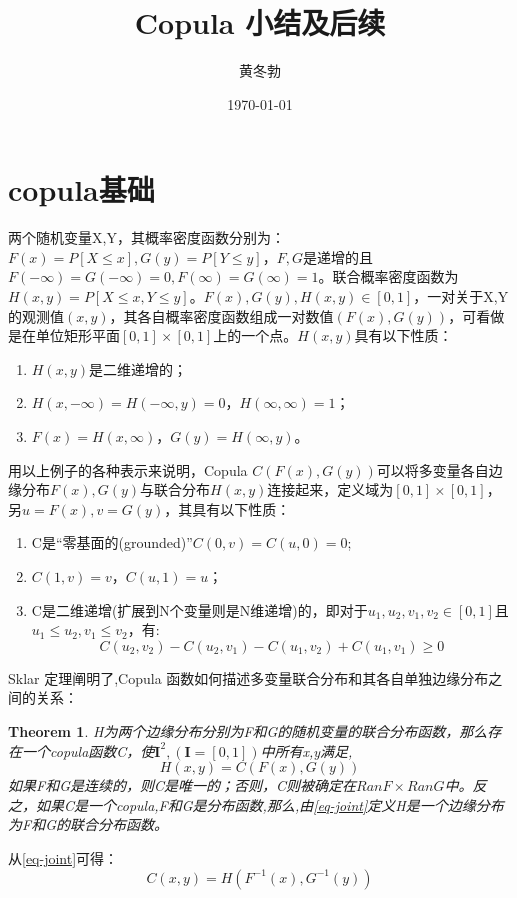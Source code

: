 \documentclass[UTF8]{ctexart}
\title{\heiti Copula 小结及后续}
\author{\kaishu 黄冬勃}
\date{\today}
\newtheorem{theorem}{Theorem}[section]
\begin{document}
\maketitle

\section{copula基础}
两个随机变量X,Y，其概率密度函数分别为：$F(x) = P[X\leq x], G(y) = P[Y \leq y]$，$F,G$是递增的且$F(-\infty)=G(-\infty)=0,F(\infty)=G(\infty)=1$。联合概率密度函数为$H(x,y) = P[X\leq x, Y\leq y]$。$F(x),G(y),H(x,y) \in [0,1]$，一对关于X,Y的观测值$(x,y)$，其各自概率密度函数组成一对数值$(F(x),G(y))$，可看做是在单位矩形平面$[0,1]\times[0,1]$上的一个点。$H(x,y)$具有以下性质：
\begin{enumerate}[1.]
    \item $H(x,y)$是二维递增的；
    \item $H(x,-\infty) = H(-\infty,y) = 0$，$H(\infty,\infty)=1$；
    \item $F(x) = H(x,\infty)$，$G(y) = H(\infty,y)$。
\end{enumerate}

用以上例子的各种表示来说明，Copula $C(F(x),G(y))$可以将多变量各自边缘分布$F(x),G(y)$与联合分布$H(x,y)$连接起来，定义域为$[0,1]\times[0,1]$，另$u=F(x),v=G(y)$，其具有以下性质：
\begin{enumerate}[1.]
    \item C是``零基面的(grounded)''$C(0,v)=C(u,0)=0$;
    \item $C(1,v) = v$，$C(u,1)=u$；
    \item C是二维递增(扩展到N个变量则是N维递增)的，即对于$u_1,u_2,v_1,v_2 \in [0,1]$且$u_1 \leq u_2, v_1 \leq v_2$，有:
        \begin{equation*}
            C(u_2,v_2) - C(u_2,v_1) - C(u_1,v_2) + C(u_1,v_1) \geq 0
        \end{equation*}
\end{enumerate}

Sklar 定理阐明了,Copula 函数如何描述多变量联合分布和其各自单独边缘分布之间的关系\cite{Bill2000An}：
\begin{theorem}
    H为两个边缘分布分别为F和G的随机变量的联合分布函数，那么存在一个copula函数C，使$\mathbf{I}^2, (\mathbf{I}=[0,1])$中所有x,y满足,
    \begin{equation}
        H(x,y) = C(F(x),G(y))
        \label{eq-joint}
    \end{equation}
    如果F和G是连续的，则C是唯一的；否则，C则被确定在$RanF\times RanG$中。反之，如果C是一个copula,F和G是分布函数,那么,由\cref{eq-joint}定义H是一个边缘分布为F和G的联合分布函数。
    \label{thr-sklar}
\end{theorem}
从\cref{eq-joint}可得：
\begin{equation}
    C(x,y) = H(F^{-1}(x),G^{-1}(y))
    \label{eq-copula}
\end{equation}
\end{document}
